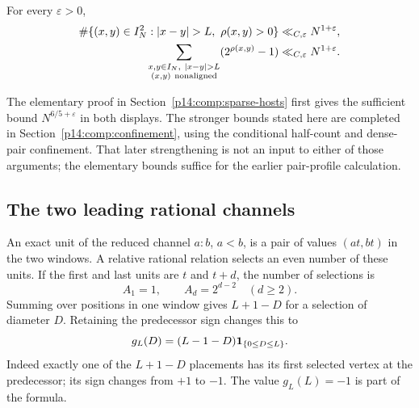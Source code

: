 \begin{proposition}\label{p1:arith:hosts}
For every $\varepsilon>0$,
\begin{align}
 \#\{(x,y)\in I_N^2:|x-y|>L,\ \rho(x,y)>0\}
   &\ll_{C,\varepsilon}N^{1+\varepsilon},
       \label{p1:arith:hostbound}\\
 \sum_{\substack{x,y\in I_N,\ |x-y|>L\\(x,y)\ {\rm nonaligned}}}
       (2^{\rho(x,y)}-1)
   &\ll_{C,\varepsilon}N^{1+\varepsilon}.
       \label{p1:arith:nonaligned}
\end{align}
\end{proposition}

The elementary proof in Section~\ref{p14:comp:sparse-hosts} first gives
the sufficient bound $N^{6/5+\varepsilon}$ in both displays.
The stronger bounds stated here are completed in
Section~\ref{p14:comp:confinement}, using the conditional half-count
and dense-pair confinement. That later strengthening is not an input
to either of those arguments; the elementary bounds suffice for the
earlier pair-profile calculation.

\subsection{The two leading rational channels}

An exact unit of the reduced channel $a:b$, $a<b$, is a pair of values
$(at,bt)$ in the two windows.  A relative rational relation selects an even
number of these units.  If the first and last units are $t$ and $t+d$, the
number of selections is
\[
 A_1=1,\qquad A_d=2^{d-2}\quad(d\geq2).
\]
Summing over positions in one window gives $L+1-D$ for a selection of
diameter $D$.  Retaining the predecessor sign changes this to
\begin{equation}\label{p1:arith:diametersign}
 g_L(D)=(L-1-D)\mathbf 1_{\{0\leq D\leq L\}}.
\end{equation}
Indeed exactly one of the $L+1-D$ placements has its first selected vertex
at the predecessor; its sign changes from $+1$ to $-1$.  The value
$g_L(L)=-1$ is part of the formula.

